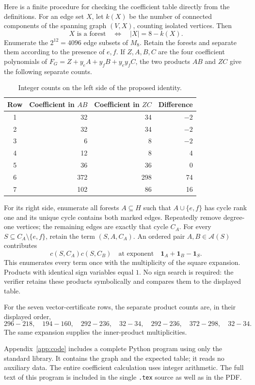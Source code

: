 \documentclass[11pt,a4paper]{article}
\newcommand{\Asets}{\mathcal A}
\newcommand{\ind}{\mathbf 1}
\begin{document}
Here is a finite procedure for checking the coefficient table directly
from the definitions. For an edge set $X$, let $k(X)$ be the number
of connected components of the spanning graph $(V,X)$, counting
isolated vertices. Then
\[
 X\text{ is a forest}\quad\Longleftrightarrow\quad |X|=8-k(X).
\]
Enumerate the $2^{12}=4096$ edge subsets of $M_8$. Retain the
forests and separate them according to the presence of $e,f$.
If $Z,A,B,C$ are the four coefficient polynomials of
$F_G=Z+y_eA+y_fB+y_ey_fC$, the two products $AB$ and $ZC$
give the following separate counts.

\begin{table}[ht]
\centering
\begin{tabular}{crrr}
\toprule
Row & Coefficient in $AB$ & Coefficient in $ZC$ & Difference\\
\midrule
1 & 32 & 34 & $-2$\\
2 & 32 & 34 & $-2$\\
3 & 6 & 8 & $-2$\\
4 & 12 & 8 & 4\\
5 & 36 & 36 & 0\\
6 & 372 & 298 & 74\\
7 & 102 & 86 & 16\\
\bottomrule
\end{tabular}
\caption{Integer counts on the left side of the proposed identity.}
\end{table}

For its right side, enumerate all forests $A\subseteq H$ such that
$A\cup\{e,f\}$ has cycle rank one and its unique cycle contains
both marked edges. Repeatedly remove degree-one vertices; the
remaining edges are exactly that cycle $C_A$. For every
$S\subseteq C_A\setminus\{e,f\}$, retain the term $(S,A,C_A)$.
An ordered pair $A,B\in\Asets(S)$ contributes
\[
 c(S,C_A)c(S,C_B)
 \quad\text{at exponent}\quad
 \ind_A+\ind_B-\ind_S.
\]
This enumerates every term once with the multiplicity of the square
expansion. Products with identical sign variables equal $1$.
No sign search is required: the verifier retains these products
symbolically and compares them to the displayed table.

For the seven vector-certificate rows, the separate product counts
are, in their displayed order,
\[
296-218,\quad194-160,\quad292-236,\quad32-34,\quad
292-236,\quad372-298,\quad32-34.
\]
The same expansion supplies the inner-product multiplicities.

Appendix~\ref{app:code} includes a complete Python program using only
the standard library. It contains the graph and the expected table;
it reads no auxiliary data. The entire coefficient calculation uses
integer arithmetic. The full text of this program is included in
the single \texttt{.tex} source as well as in the PDF.
\end{document}
